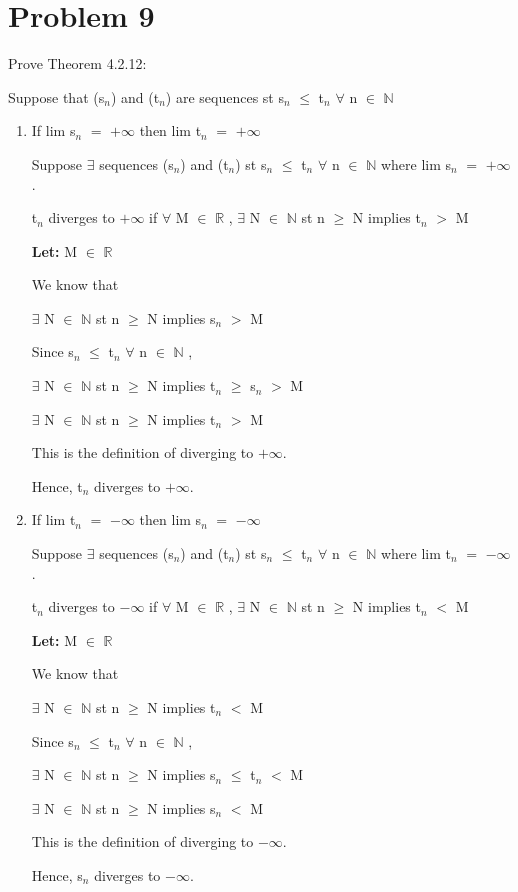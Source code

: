 \documentclass{article}
\newcommand{\mt}[1]{\ensuremath{#1}}
\newcommand\bsc[2][\DefaultOpt]{%
  \def\DefaultOpt{#2}%
  \section[#1]{#2}%
}
\newcommand{\balist}{\begin{enumerate}[label=\alph*.]}
\newcommand{\elist}{\end{enumerate}}
\newcommand{\lt}[1]{\textbf{Let: } #1}
\newcommand{\br}{\mt{\mathbb{R}} }       %
\newcommand{\bn}{\mt{\mathbb{N}} }       %
\newcommand{\fa}{\mt{\forall} }          %
\newcommand{\mem}{\mt{\in} }
\newcommand{\exs}{\mt{\exists} }
\newcommand{\prn}[1]{(#1)}
\newcommand{\ls}{\mt{<} }
\newcommand{\gr}{\mt{>} }
\newcommand{\lse}{\mt{\leq} }
\newcommand{\gre}{\mt{\geq} }
\newcommand{\eql}{\mt{=} }
\newcommand{\uw}[2]{#1\mt{_{#2}}}
\begin{document}
\bsc{Problem 9}{
Prove Theorem 4.2.12:

Suppose that \prn{\uw{s}{n}} and \prn{\uw{t}{n}} are sequences st \uw{s}{n} \lse \uw{t}{n} \fa n \mem \bn

\balist
\item If lim \uw{s}{n} \eql $+\infty$ then lim \uw{t}{n} \eql $+\infty$
	
	Suppose \exs sequences \prn{\uw{s}{n}} and \prn{\uw{t}{n}} st \uw{s}{n} \lse \uw{t}{n} \fa n \mem \bn where lim \uw{s}{n} \eql $+\infty$.
	
	\uw{t}{n} diverges to $+\infty$ if \fa M \mem \br, \exs N \mem \bn st n \gre N implies \uw{t}{n} \gr M
	
	\lt{M \mem \br}
	
	We know that
	
	\exs N \mem \bn st n \gre N implies \uw{s}{n} \gr M
	
	Since \uw{s}{n} \lse \uw{t}{n} \fa n \mem \bn,
	
	\exs N \mem \bn st n \gre N implies \uw{t}{n} \gre \uw{s}{n} \gr M
	
	\exs N \mem \bn st n \gre N implies \uw{t}{n} \gr M
	
	This is the definition of diverging to $+\infty$.
	
	Hence, \uw{t}{n} diverges to $+\infty$.
	
\item If lim \uw{t}{n} \eql $-\infty$ then lim \uw{s}{n} \eql $-\infty$
	
	Suppose \exs sequences \prn{\uw{s}{n}} and \prn{\uw{t}{n}} st \uw{s}{n} \lse \uw{t}{n} \fa n \mem \bn where lim \uw{t}{n} \eql $-\infty$.
	
	\uw{t}{n} diverges to $-\infty$ if \fa M \mem \br, \exs N \mem \bn st n \gre N implies \uw{t}{n} \ls M
	
	\lt{M \mem \br}
	
	We know that
	
	\exs N \mem \bn st n \gre N implies \uw{t}{n} \ls M
	
	Since \uw{s}{n} \lse \uw{t}{n} \fa n \mem \bn,
	
	\exs N \mem \bn st n \gre N implies \uw{s}{n} \lse \uw{t}{n} \ls M
	
	\exs N \mem \bn st n \gre N implies \uw{s}{n} \ls M
	
	This is the definition of diverging to $-\infty$.
	
	Hence, \uw{s}{n} diverges to $-\infty$.
\elist
}
\newpage
\end{document}
